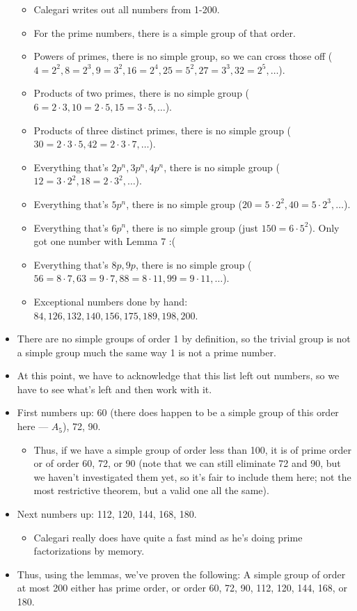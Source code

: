 \documentclass[../notes.tex]{subfiles}
\begin{document}
\begin{itemize}
    \begin{itemize}
        \item Calegari writes out all numbers from 1-200.
        \item For the prime numbers, there is a simple group of that order.
        \item Powers of primes, there is no simple group, so we can cross those off ($4=2^2,8=2^3,9=3^2,16=2^4,25=5^2,27=3^3,32=2^5,\dots$).
        \item Products of two primes, there is no simple group ($6=2\cdot 3,10=2\cdot 5,15=3\cdot 5,\dots$).
        \item Products of three distinct primes, there is no simple group ($30=2\cdot 3\cdot 5,42=2\cdot 3\cdot 7,\dots$).
        \item Everything that's $2p^n,3p^n,4p^n$, there is no simple group ($12=3\cdot 2^2,18=2\cdot 3^2,\dots$).
        \item Everything that's $5p^n$, there is no simple group ($20=5\cdot 2^2,40=5\cdot 2^3,\dots$).
        \item Everything that's $6p^n$, there is no simple group (just $150=6\cdot 5^2$). Only got one number with Lemma 7 :(
        \item Everything that's $8p,9p$, there is no simple group ($56=8\cdot 7,63=9\cdot 7,88=8\cdot 11,99=9\cdot 11,\dots$).
        \item Exceptional numbers done by hand: $84,126,132,140,156,175,189,198,200$.
    \end{itemize}
    \item There are no simple groups of order 1 by definition, so the trivial group is not a simple group much the same way 1 is not a prime number.
    \item At this point, we have to acknowledge that this list left out numbers, so we have to see what's left and then work with it.
    \item First numbers up: 60 (there does happen to be a simple group of this order here --- $A_5$), 72, 90.
    \begin{itemize}
        \item Thus, if we have a simple group of order less than 100, it is of prime order or of order 60, 72, or 90 (note that we can still eliminate 72 and 90, but we haven't investigated them yet, so it's fair to include them here; not the most restrictive theorem, but a valid one all the same).
    \end{itemize}
    \item Next numbers up: 112, 120, 144, 168, 180.
    \begin{itemize}
        \item Calegari really does have quite a fast mind as he's doing prime factorizations by memory.
    \end{itemize}
    \item Thus, using the lemmas, we've proven the following: A simple group of order at most 200 either has prime order, or order 60, 72, 90, 112, 120, 144, 168, or 180.
\end{itemize}
\end{document}
